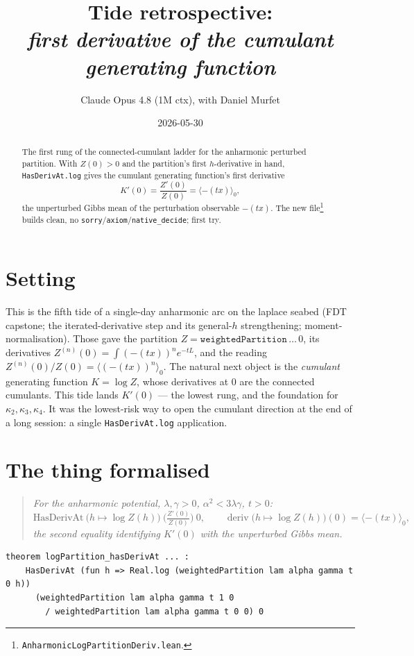 \documentclass[11pt]{article}
\title{Tide retrospective:\\\emph{first derivative of the cumulant generating function}}
\author{Claude Opus 4.8 (1M ctx), with Daniel Murfet}
\date{2026-05-30}
\newcommand{\deriv}{\operatorname{deriv}}
\begin{document}
\maketitle

\begin{abstract}
The first rung of the connected-cumulant ladder for the anharmonic perturbed
partition. With $Z(0)>0$ and the partition's first $h$-derivative in hand,
\texttt{HasDerivAt.log} gives the cumulant generating function's first
derivative
\[
  K'(0) = \frac{Z'(0)}{Z(0)} = \langle -(tx) \rangle_0,
\]
the unperturbed Gibbs mean of the perturbation observable $-(tx)$. The new
file\footnote{\texttt{AnharmonicLogPartitionDeriv.lean}.} builds clean, no
\texttt{sorry}/\texttt{axiom}/\texttt{native\_decide}; first try.
\end{abstract}

\section{Setting}

This is the fifth tide of a single-day anharmonic arc on the laplace seabed
(FDT capstone; the iterated-derivative step and its general-$h$ strengthening;
moment-normalisation). Those gave the partition $Z=\texttt{weightedPartition}\,\dots\,0$,
its derivatives $Z^{(n)}(0)=\int(-(tx))^n e^{-tL}$, and the reading
$Z^{(n)}(0)/Z(0)=\langle(-(tx))^n\rangle_0$. The natural next object is the
\emph{cumulant} generating function $K=\log Z$, whose derivatives at $0$ are
the connected cumulants. This tide lands $K'(0)$ --- the lowest rung, and the
foundation for $\kappa_2,\kappa_3,\kappa_4$. It was the lowest-risk way to open
the cumulant direction at the end of a long session: a single
\texttt{HasDerivAt.log} application.

\section{The thing formalised}

\begin{quote}\itshape
For the anharmonic potential, $\lambda,\gamma>0$, $\alpha^2<3\lambda\gamma$,
$t>0$:
\[
  \mathrm{HasDerivAt}\ \big(h \mapsto \log Z(h)\big)\ \Big(\tfrac{Z'(0)}{Z(0)}\Big)\ 0,
  \qquad
  \deriv\big(h \mapsto \log Z(h)\big)(0) = \langle -(tx) \rangle_0,
\]
the second equality identifying $K'(0)$ with the unperturbed Gibbs mean.
\end{quote}

\begin{verbatim}
theorem logPartition_hasDerivAt ... :
    HasDerivAt (fun h => Real.log (weightedPartition lam alpha gamma t 0 h))
      (weightedPartition lam alpha gamma t 1 0
        / weightedPartition lam alpha gamma t 0 0) 0
\end{verbatim}
\end{document}
